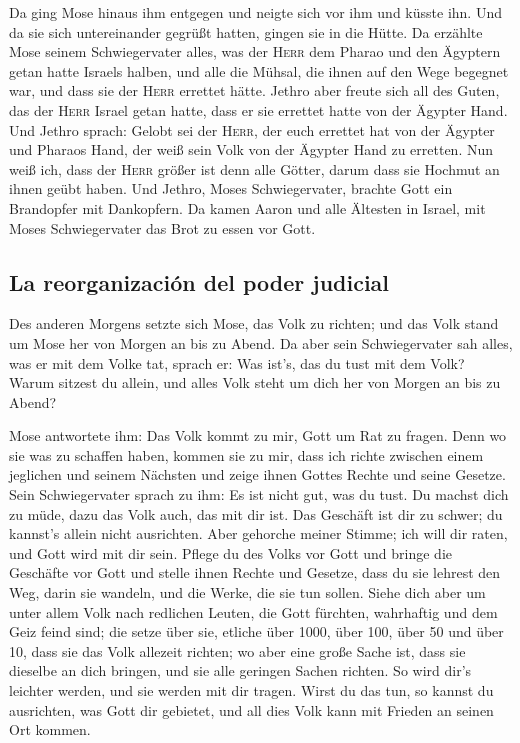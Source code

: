  Da ging Mose hinaus ihm entgegen und neigte sich vor ihm
und küsste ihn. Und da sie sich untereinander gegrüßt hatten, gingen sie
in die Hütte.  Da erzählte Mose seinem Schwiegervater
alles, was der \textsc{Herr} dem Pharao und den Ägyptern getan hatte
Israels halben, und alle die Mühsal, die ihnen auf den Wege begegnet
war, und dass sie der \textsc{Herr} errettet hätte. 
Jethro aber freute sich all des Guten, das der \textsc{Herr} Israel
getan hatte, dass er sie errettet hatte von der Ägypter Hand.
 Und Jethro sprach: Gelobt sei der \textsc{Herr}, der
euch errettet hat von der Ägypter und Pharaos Hand, der weiß sein Volk
von der Ägypter Hand zu erretten.  Nun weiß ich, dass der
\textsc{Herr} größer ist denn alle Götter, darum dass sie Hochmut an
ihnen geübt haben.  Und Jethro, Moses Schwiegervater,
brachte Gott ein Brandopfer mit Dankopfern. Da kamen Aaron und alle
Ältesten in Israel, mit Moses Schwiegervater das Brot zu essen vor Gott.

\hypertarget{la-reorganizaciuxf3n-del-poder-judicial}{%
\subsection{La reorganización del poder
judicial}\label{la-reorganizaciuxf3n-del-poder-judicial}}

 Des anderen Morgens setzte sich Mose, das Volk zu
richten; und das Volk stand um Mose her von Morgen an bis zu Abend.
 Da aber sein Schwiegervater sah alles, was er mit dem
Volke tat, sprach er: Was ist's, das du tust mit dem Volk? Warum sitzest
du allein, und alles Volk steht um dich her von Morgen an bis zu Abend?

 Mose antwortete ihm: Das Volk kommt zu mir, Gott um Rat
zu fragen.  Denn wo sie was zu schaffen haben, kommen sie
zu mir, dass ich richte zwischen einem jeglichen und seinem Nächsten und
zeige ihnen Gottes Rechte und seine Gesetze.  Sein
Schwiegervater sprach zu ihm: Es ist nicht gut, was du tust.
 Du machst dich zu müde, dazu das Volk auch, das mit dir
ist. Das Geschäft ist dir zu schwer; du kannst's allein nicht
ausrichten.  Aber gehorche meiner Stimme; ich will dir
raten, und Gott wird mit dir sein. Pflege du des Volks vor Gott und
bringe die Geschäfte vor Gott  und stelle ihnen Rechte
und Gesetze, dass du sie lehrest den Weg, darin sie wandeln, und die
Werke, die sie tun sollen.  Siehe dich aber um unter
allem Volk nach redlichen Leuten, die Gott fürchten, wahrhaftig und dem
Geiz feind sind; die setze über sie, etliche über 1000, über 100, über
50 und über 10,  dass sie das Volk allezeit richten; wo
aber eine große Sache ist, dass sie dieselbe an dich bringen, und sie
alle geringen Sachen richten. So wird dir's leichter werden, und sie
werden mit dir tragen.  Wirst du das tun, so kannst du
ausrichten, was Gott dir gebietet, und all dies Volk kann mit Frieden an
seinen Ort kommen.

